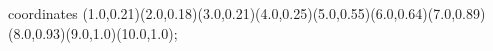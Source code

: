 					coordinates { (1.0,0.21)(2.0,0.18)(3.0,0.21)(4.0,0.25)(5.0,0.55)(6.0,0.64)(7.0,0.89)(8.0,0.93)(9.0,1.0)(10.0,1.0)};